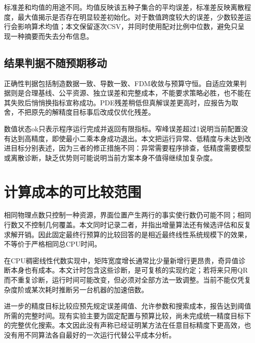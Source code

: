 标准差和均值的用途不同。均值反映该五种子集合的平均误差，标准差反映离散程度，最大值揭示是否存在明显较差初始化。对于数值跨度较大的误差，少数较差运行会影响算术均值；本文保留逐次CSV，并同时使用配对比例中位数，避免只呈现一种摘要而失去分布信息。

\subsection{结果判据不随预期移动}
正确性判据包括制造数据一致、导数一致、FDM收敛与预算守恒。自适应效果判据则是合理基线、公平资源、独立误差和完整成本，不能要求策略必胜，也不能在其失败后悄悄换指标宣称成功。PDE残差稍低但真解误差更高时，应报告为取舍，不把原先的解精度目标事后改成仅优化残差。

数值状态ok只表示程序运行完成并返回有限指标。窄峰误差超过1说明当前配置没有达到高精度，即使最小二乘本身成功退出。本文把运行异常、低精度与未达到改进目标分别表述，因为三者的修正措施不同：异常需要程序排查，低精度需要模型或离散诊断，缺乏优势则可能说明当前方案本身不值得继续加复杂度。

\section{计算成本的可比较范围}
相同物理点数只控制一种资源，界面位置产生两行的事实使行数仍可能不同；相同行数又不控制几何覆盖。本文同时记录二者，并指出增量算法还有候选评估和反复求解开销。因此固定最终行预算的比较回答的是相近最终线性系统规模下的效果，不等价于严格相同总CPU时间。

在CPU稠密线性代数实现中，矩阵宽度增长通常比少量新增行更昂贵，奇异值诊断本身也有成本。本文计时包含这些诊断，是可复核的实现约定；若将来只用QR而不重复诊断，运行时间可能改变，但必须对全部方法一致调整。当前不能仅凭复杂度阶或某次耗时推断另一台机器的加速倍数。

进一步的精度目标比较应预先规定误差阈值、允许参数和搜索成本，报告达到阈值所需的完整时间。现有实验主要为固定配置与预算比较，尚未完成统一精度目标下的完整优化搜索。本文因此没有声称已经证明某方法在任意目标精度下更高效，也没有用不同算法各自最好的一次运行代替公平成本分析。
